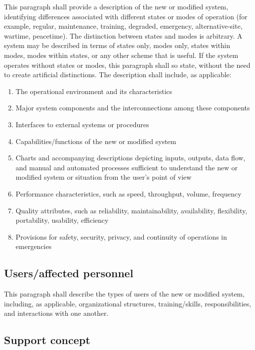 This paragraph shall provide a description of the new or modified
system, identifying differences associated with different states or
modes of operation (for example, regular, maintenance, training,
degraded, emergency, alternative-site, wartime, peacetime). The
distinction between states and modes is arbitrary. A system may be
described in terms of states only, modes only, states within modes,
modes within states, or any other scheme that is useful. If the system
operates without states or modes, this paragraph shall so state, without
the need to create artificial distinctions. The description shall
include, as applicable:

\begin{enumerate}
\itemsep1pt\parskip0pt
\item
  The operational environment and its characteristics
\item
  Major system components and the interconnections among these
  components
\item
  Interfaces to external systems or procedures
\item
  Capabilities/functions of the new or modified system
\item
  Charts and accompanying descriptions depicting inputs, outputs, data
  flow, and manual and automated processes sufficient to understand the
  new or modified system or situation from the user's point of view
\item
  Performance characteristics, such as speed, throughput, volume,
  frequency
\item
  Quality attributes, such as reliability, maintainability,
  availability, flexibility, portability, usability, efficiency
\item
  Provisions for safety, security, privacy, and continuity of operations
  in emergencies
\end{enumerate}

\subsection{Users/affected personnel}

This paragraph shall describe the types of users of the new or modified
system, including, as applicable, organizational structures,
training/skills, responsibilities, and interactions with one another.

\subsection{Support concept}

